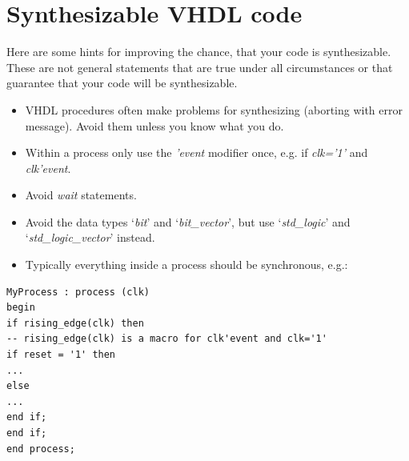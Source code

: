 \hypertarget{synthesizable-vhdl-code}{%
\section{Synthesizable VHDL code}\label{synthesizable-vhdl-code}}

Here are some hints for improving the chance, that your code is
synthesizable. These are not general statements that are true under all
circumstances or that guarantee that your code will be synthesizable.

\begin{itemize}
\item
  VHDL procedures often make problems for synthesizing (aborting with
  error message). Avoid them unless you know what you do.
\item
  Within a process only use the \emph{'event} modifier once, e.g. if
  \emph{clk='1'} and \emph{clk'event}.
\item
  Avoid \emph{wait} statements.
\item
  Avoid the data types `\emph{bit}' and `\emph{bit\_vector}', but use
  `\emph{std\_logic}' and `\emph{std\_logic\_vector}' instead.
\item
  Typically everything inside a process should be synchronous, e.g.:
\end{itemize}
\begin{lstlisting}
MyProcess : process (clk)
begin
if rising_edge(clk) then
-- rising_edge(clk) is a macro for clk'event and clk='1'
if reset = '1' then
...
else
...
end if;
end if;
end process;	
\end{lstlisting}

